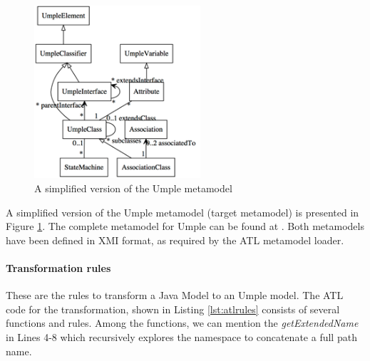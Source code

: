 \begin{figure}[h!]
\centering
\includegraphics[width=0.55\textwidth]{Figures/umpleMetamodel.png} 
\caption{A simplified version of the Umple metamodel}
\label{fig:umplemodelatl}
\end{figure}
A simplified version of the Umple metamodel (target metamodel) is presented in Figure \ref{fig:umplemodelatl}. The complete metamodel for Umple can be found at \cite{UmpleMetamodel}. Both metamodels have been defined in XMI format, as required by the ATL metamodel loader.

\paragraph{Transformation rules} 

These are the rules to transform a Java Model to an Umple model. The ATL code for the transformation, shown in Listing \ref{lst:atlrules} consists of several functions and rules. Among the functions, we can mention the \textit{getExtendedName} in Lines 4-8 which recursively explores the namespace to concatenate a full path name.


